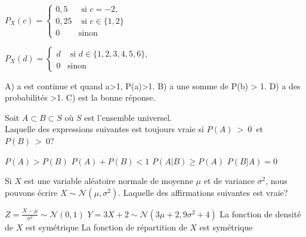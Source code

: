 \begin{questions}
\begin{checkboxes}
\CorrectChoice $ \displaystyle P_X(c)= \left\{
\begin{array}{ll}
0,5  & \mbox{ si } c=-2, \\
0,25 & \mbox{ si } c \in \{1, 2\} \\
0 & \mbox{sinon}
\end{array}
\right. $

\vspace{0.3cm}

\choice $P_X(d)=\left\{
\begin{array}{ll}
d  & \mbox{ si } d\in \{1,2,3,4,5,6\}, \\
0 & \mbox{sinon}
\end{array}
\right.$
\end{checkboxes}

\vspace{1cm}

\begin{solution}
A) a est continue et quand a>1, P(a)>1. B) a une somme de P(b) > 1. D) a des probabilités >1. C) est la bonne réponse.
\end{solution}

\question[3] Soit $A\subset B \subset S$ où $S$ est l'ensemble universel.\\
Laquelle des expressions suivantes est toujours vraie si $P(A)~>~0$~et~$P(B)~>~0$?

\begin{oneparcheckboxes}
    \choice $P(A) > P(B)$
    \choice $P(A)+P(B)<1$
    \correctchoice $P(A|B)\geq P(A)$
    \choice $P(B|A)=0$
\end{oneparcheckboxes}

\vspace{1cm}

\question[3] Si $X$ est une variable aléatoire normale de moyenne $\mu$ et de variance $\sigma^2$, nous pouvons écrire $X\sim\mathcal{N}(\mu, \sigma^2)$. Laquelle des affirmations suivantes est vraie? %

\begin{checkboxes}
\choice $\displaystyle Z=\frac{X-\mu}{\sigma^2}\sim \mathcal{N}(0, 1)$
\choice $\displaystyle Y=3X+2 \sim \mathcal{N}(3\mu+2, 9\sigma^2 + 4)$
\CorrectChoice La fonction de densité de $X$ est symétrique
\choice La fonction de répartition de $X$ est symétrique
\end{checkboxes}

\vspace{1cm}


\end{questions}
